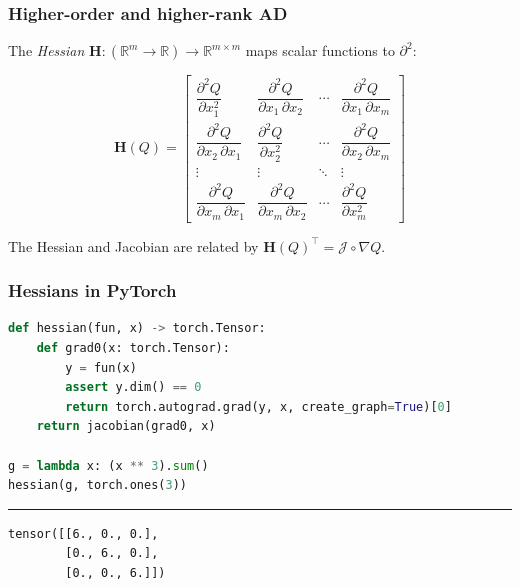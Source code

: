 \documentclass{beamer}
\begin{document}
    \begin{frame}
        \frametitle{Higher-order and higher-rank AD}

        The \textit{Hessian} $\mathbf{H}:(\mathbb{R}^m\rightarrow\mathbb{R})\rightarrow\mathbb{R}^{m\times m}$ maps scalar functions to $\partial^2$:

        \begin{equation*}
            \mathbf{H}(Q) = \begin{bmatrix}{\dfrac {\partial ^{2}Q}{\partial x_{1}^{2}}}
                                &{\dfrac {\partial ^{2}Q}{\partial x_{1}\,\partial x_{2}}}&\cdots &{\dfrac {\partial ^{2}Q}{\partial x_{1}\,\partial x_{m}}}\\[2.2ex]{\dfrac {\partial ^{2}Q}{\partial x_{2}\,\partial x_{1}}}&{\dfrac {\partial ^{2}Q}{\partial x_{2}^{2}}}&\cdots &{\dfrac {\partial ^{2}Q}{\partial x_{2}\,\partial x_{m}}}\\[2.2ex]\vdots &\vdots &\ddots &\vdots \\[2.2ex]{\dfrac {\partial ^{2}Q}{\partial x_{m}\,\partial x_{1}}}&{\dfrac {\partial ^{2}Q}{\partial x_{m}\,\partial x_{2}}}&\cdots &{\dfrac {\partial ^{2}Q}{\partial x_{m}^{2}}}
            \end{bmatrix}
        \end{equation*}

        The Hessian and Jacobian are related by $\mathbf{H}(Q)^\intercal = \mathcal{J} \circ \nabla Q$.
    \end{frame}

    \begin{frame}[fragile]
        \frametitle{Hessians in PyTorch}
        \begin{lstlisting}[language=Python]
def hessian(fun, x) -> torch.Tensor:
    def grad0(x: torch.Tensor):
        y = fun(x)
        assert y.dim() == 0
        return torch.autograd.grad(y, x, create_graph=True)[0]
    return jacobian(grad0, x)

g = lambda x: (x ** 3).sum()
hessian(g, torch.ones(3))
        \end{lstlisting}

        \noindent\rule{\textwidth}{0.5pt}

        \begin{lstlisting}
tensor([[6., 0., 0.],
        [0., 6., 0.],
        [0., 0., 6.]])
        \end{lstlisting}
    \end{frame}
\end{document}
